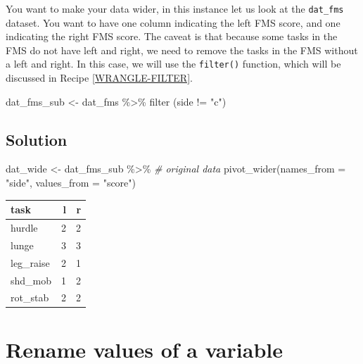\documentclass[
]{book}
\newenvironment{Shaded}{\begin{snugshade}}{\end{snugshade}}
\newcommand{\AttributeTok}[1]{\textcolor[rgb]{0.77,0.63,0.00}{#1}}
\newcommand{\CommentTok}[1]{\textcolor[rgb]{0.56,0.35,0.01}{\textit{#1}}}
\newcommand{\FunctionTok}[1]{\textcolor[rgb]{0.00,0.00,0.00}{#1}}
\newcommand{\NormalTok}[1]{#1}
\newcommand{\OtherTok}[1]{\textcolor[rgb]{0.56,0.35,0.01}{#1}}
\newcommand{\SpecialCharTok}[1]{\textcolor[rgb]{0.00,0.00,0.00}{#1}}
\newcommand{\StringTok}[1]{\textcolor[rgb]{0.31,0.60,0.02}{#1}}
\begin{document}
You want to make your data wider, in this instance let us look at the \texttt{dat\_fms} dataset. You want to have one column indicating the left FMS score, and one indicating the right FMS score. The caveat is that because some tasks in the FMS do not have left and right, we need to remove the tasks in the FMS without a left and right. In this case, we will use the \texttt{filter()} function, which will be discussed in Recipe \ref{WRANGLE-FILTER}.

\begin{Shaded}
\begin{Highlighting}[]
\NormalTok{dat\_fms\_sub }\OtherTok{\textless{}{-}}\NormalTok{ dat\_fms }\SpecialCharTok{\%\textgreater{}\%}
  \FunctionTok{filter}\NormalTok{ (side }\SpecialCharTok{!=} \StringTok{"c"}\NormalTok{)}
\end{Highlighting}
\end{Shaded}

\hypertarget{solution-6}{%
\subsection{Solution}\label{solution-6}}

\begin{Shaded}
\begin{Highlighting}[]
\NormalTok{dat\_wide }\OtherTok{\textless{}{-}}\NormalTok{ dat\_fms\_sub }\SpecialCharTok{\%\textgreater{}\%} \CommentTok{\# original data}
  \FunctionTok{pivot\_wider}\NormalTok{(}\AttributeTok{names\_from =} \StringTok{"side"}\NormalTok{,}
              \AttributeTok{values\_from =} \StringTok{"score"}\NormalTok{)}
\end{Highlighting}
\end{Shaded}

\begin{tabular}{l|r|r}
\hline
task & l & r\\
\hline
hurdle & 2 & 2\\
\hline
lunge & 3 & 3\\
\hline
leg\_raise & 2 & 1\\
\hline
shd\_mob & 1 & 2\\
\hline
rot\_stab & 2 & 2\\
\hline
\end{tabular}

\hypertarget{WRANGLE-RENAME-VALUES}{%
\section{Rename values of a variable}\label{WRANGLE-RENAME-VALUES}}
\end{document}
